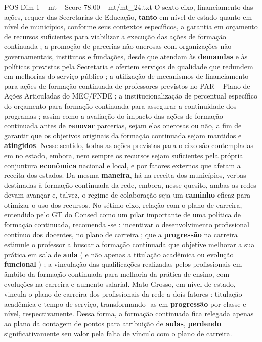 \begin{textsample}{POS Dim 1 – mt – Score 78.00 – mt/mt\_24.txt}
O sexto eixo, financiamento das ações, requer das Secretarias de Educação, \textbf{tanto} em nível de estado quanto em nível de municípios, conforme seus contextos específicos, a garantia em orçamento de recursos suficientes para viabilizar a execução das ações de formação continuada ; a promoção de parcerias não onerosas com organizações não governamentais, institutos e fundações, desde que atendam às \textbf{demandas} e às políticas previstas pela Secretaria e ofertem serviços de qualidade que redundem em melhorias do serviço público ; a utilização de mecanismos de financiamento para ações de formação continuada de professores previstos no PAR – Plano de Ações Articuladas do MEC/FNDE ; a institucionalização de percentual específico do orçamento para formação continuada para assegurar a continuidade dos programas ; assim como a avaliação do impacto das ações de formação continuada antes de \textbf{renovar} parcerias, sejam elas onerosas ou não, a fim de garantir que os objetivos originais da formação continuada sejam mantidos e \textbf{atingidos}.
Nesse sentido, todas as ações previstas para o eixo são contempladas em no estado, embora, nem sempre os recursos sejam suficientes pela própria conjuntura \textbf{econômica} nacional e local, e por fatores externos que afetam a receita dos estados.
Da mesma \textbf{maneira}, há na receita dos municípios, verbas destinadas à formação continuada da rede, embora, nesse quesito, ambas as redes devam avançar e, talvez, o regime de colaboração seja um \textbf{caminho} eficaz para otimizar o uso dos recursos.
No sétimo eixo, relação com o plano de carreira, entendido pelo GT do Consed como um pilar importante de uma política de formação continuada, recomenda -se : incentivar o desenvolvimento profissional contínuo dos docentes, no plano de carreira ; que a \textbf{progressão} na carreira estimule o professor a buscar a formação continuada que objetive melhorar a sua prática em sala de \textbf{aula} ( e não apenas a titulação acadêmica ou evolução \textbf{funcional} ) ; a vinculação das qualificações realizadas pelos profissionais em âmbito da formação continuada para melhoria da prática de ensino, com evoluções na carreira e aumento salarial.
Mato Grosso, em nível de estado, vincula o plano de carreira dos profissionais da rede a dois fatores : titulação acadêmica e tempo de serviço, transformando -as em \textbf{progressão} por classe e nível, respectivamente.
Dessa forma, a formação continuada fica relegada apenas ao plano da contagem de pontos para atribuição de \textbf{aulas}, \textbf{perdendo} significativamente seu valor pela falta de vínculo com o plano de carreira.

\end{textsample}
